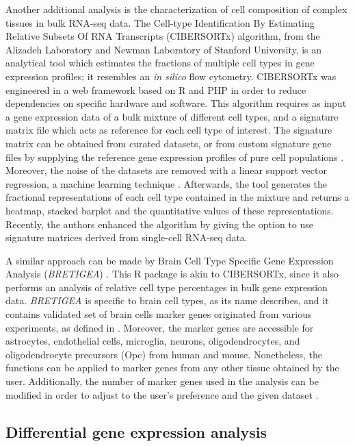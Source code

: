 Another additional analysis is the characterization of cell composition of complex tissues in bulk RNA-seq data. The Cell-type Identification By Estimating Relative Subsets Of RNA Transcripts (CIBERSORTx) \cite{Newman} algorithm, from the Alizadeh Laboratory and Newman Laboratory of Stanford University, is an analytical tool which estimates the fractions of multiple cell types in gene expression profiles; it resembles an \textit{in silico} flow cytometry. CIBERSORTx was engineered in a web framework based on R and PHP in order to reduce dependencies on specific hardware and software. This algorithm requires as input a gene expression data of a bulk mixture of different cell types, and a signature matrix file which acts as reference for each cell type of interest. The signature matrix can be obtained from curated datasets, or from custom signature gene files by supplying the reference gene expression profiles of pure cell populations \cite{Steen}. Moreover, the noise of the datasets are removed with a linear support vector regression, a machine learning technique \cite{Newman}. Afterwards, the tool generates the fractional representations of each cell type contained in the mixture and returns a heatmap, stacked barplot and the quantitative values of these representations. Recently, the authors enhanced the algorithm by giving the option to use signature matrices derived from single-cell RNA-seq data.

A similar approach can be made by Brain Cell Type Specific Gene Expression Analysis (\textit{BRETIGEA}) \cite{bretigea}. This R package is akin to CIBERSORTx, since it also performs an analysis of relative cell type percentages in bulk gene expression data. \textit{BRETIGEA} is specific to brain cell types, as its name describes, and it contains validated set of brain cells marker genes originated from various experiments, as defined in \cite{mckenzie}. Moreover, the marker genes are accessible for astrocytes, endothelial cells, microglia, neurons, oligodendrocytes, and oligodendrocyte precursors (Opc) from human and mouse. Nonetheless, the functions can be applied to marker genes from any other tissue obtained by the user. Additionally, the number of marker genes used in the analysis can be modified in order to adjust to the user's preference and the given dataset \cite{bretigea}.

\subsection{Differential gene expression analysis} \label{limma-method}


